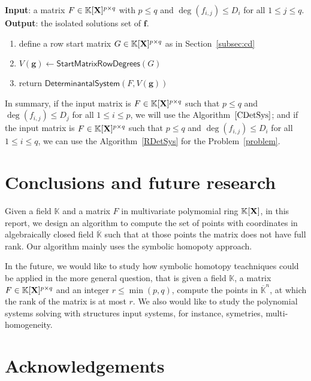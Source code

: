 \documentclass[11pt]{article}
\numberwithin{Property}{section}
\numberwithin{Theorem}{section}
\numberwithin{Proposition}{section}
\numberwithin{Lemma}{section}
\numberwithin{Corollary}{section}
\numberwithin{Definition}{section}
\numberwithin{Remark}{section}
\numberwithin{Conjecture}{section}
\numberwithin{Problem}{section}
\numberwithin{Claim}{section}
\theoremstyle{definition}
\numberwithin{Example}{section}
\def\f {\ensuremath{\mathbf{f}}}
\def\g {\ensuremath{\mathbf{g}}}
\renewcommand{\leq}{\leqslant}
\def\bar{\overline}
\newcommand{\field}{\mathbb{K}} %
\newcommand{\mat}[1]{\mathbf{\MakeUppercase{#1}}} %
\newcommand{\todo}[1]{\textcolor{red}{#1}} %
\begin{document}
\begin{algorithm}
\caption{$\mathsf{RowDeterminantal System}$}
\label{RDetSys}
{\bf Input}: a matrix $F \in \field[\mat{X}]^{p \times q}$ with $p \leq q$ and $\deg(f_{i,j}) \leq D_i$ for all $1 \leq j \leq q$.\\
{\bf Output}: the isolated solutions set of $\f$.
\begin{enumerate}
\item define a row start matrix $G \in \field[\mat{X}]^{p \times q}$ as in Section~\ref{subsec:cd}
\item $V(\g) \gets \mathsf{Start Matrix Row Degrees}(G)$
\item return $\mathsf{Determinantal System}(F, V(\g))$
\end{enumerate}
\end{algorithm}

In summary, if the input matrix is $F \in \field[\mat{X}]^{p \times q}$ such that $p \leq q$ and $\deg(f_{i,j}) \leq D_j$ for all $1 \leq i \leq p$, we will use the Algorithm~$\ref{CDetSys}$; and if the input matrix is $F \in \field[\mat{X}]^{p \times q}$ such that $p \leq q$ and $\deg(f_{i,j}) \leq D_i$ for all $1 \leq i \leq q$, we can use the Algorithm~\ref{RDetSys} for the Problem~\ref{problem}.
\section{Conclusions and future research}
Given a field $\field$ and a matrix $F$ in multivariate polymomial ring $\field[\mat{X}]$, in this report, we design an algorithm to compute the set of points with coordinates in algebraically closed field $\bar{\field}$ such that at those points the matrix does not have full rank.  Our algorithm mainly uses the symbolic homopoty approach. %

In the future, we would like to study how symbolic homotopy teachniques could be applied in the more general question, that is given a field $\field$, a matrix $F \in \field[\mat{X}]^{p \times q}$ and an integer $r \leq \min(p,q)$, compute the points in $\bar{\field}^n$, at which the rank of the matrix is at most $r$. We also would like to study the polynomial systems solving with structures input systems, for instance, symetries, multi-homogeneity. 
\label{sec:conclusion}
\section{Acknowledgements}
\newpage


\appendix
\end{document}
